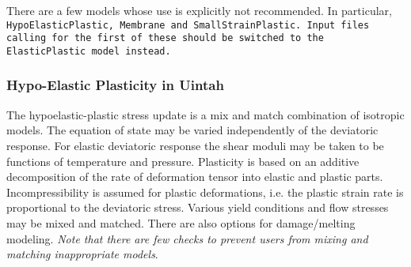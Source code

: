 There are a few models whose use is explicitly not recommended.  In particular,
\tt HypoElasticPlastic, Membrane and SmallStrainPlastic. \normalfont  Input
files calling for the first of these should be switched to the
\tt ElasticPlastic \normalfont model instead.

\subsubsection{Hypo-Elastic Plasticity in Uintah}  \label{Sec:ElasticPlastic}

The hypoelastic-plastic stress update is a mix and match combination
of isotropic models.  The equation of state may be varied
independently of the deviatoric response.  For elastic deviatoric
response the shear moduli may be taken to be functions of temperature
and pressure.  Plasticity is based on an additive decomposition of the
rate of deformation tensor into elastic and plastic parts.
Incompressibility is assumed for plastic deformations, i.e. the
plastic strain rate is proportional to the deviatoric stress.  Various
yield conditions and flow stresses may be mixed and matched.  There
are also options for damage/melting modeling.  {\it Note that there
  are few checks to prevent users from mixing and matching
  inappropriate models}.

